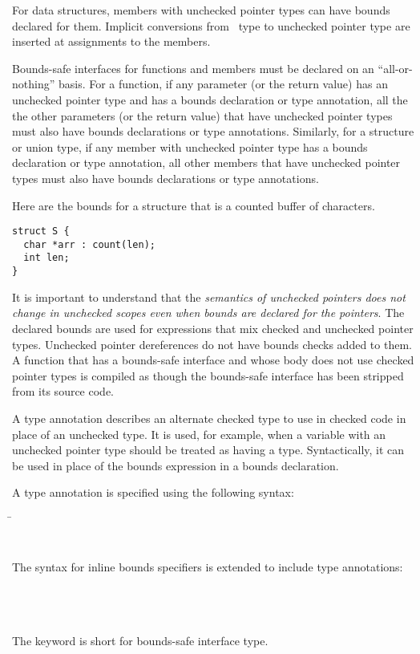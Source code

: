 For data structures, members with unchecked pointer types can
have bounds declared for them.   Implicit conversions from \arrayptr\ 
type to unchecked pointer type are inserted at assignments to the members.

Bounds-safe interfaces for functions and members must be
declared on an ``all-or-nothing'' basis.
For a function, if any parameter (or the return value) has an unchecked pointer
type and has a bounds declaration or type annotation, all the
the other parameters (or the return value) that have unchecked
pointer types must also have bounds declarations or type
annotations.  Similarly, for a structure or union type,
if any member with unchecked pointer type
has a bounds declaration or type annotation, all other members
that have unchecked pointer types must also have bounds declarations
or type annotations.

Here are the bounds for a structure that is a counted buffer of
characters.
\begin{lstlisting}
struct S {
  char *arr : count(len);
  int len;
}
\end{lstlisting}

It is important to understand that the \emph{semantics of unchecked
pointers does not change in unchecked scopes even when bounds are
declared for the pointers}. The declared bounds are used  for expressions
that mix checked and unchecked pointer types. Unchecked pointer dereferences do not
have bounds checks added to them. A function that has a bounds-safe
interface and whose body does not use checked pointer
types is compiled as though the bounds-safe interface has been
stripped from its source code.

A type annotation describes an alternate checked type to use in checked code
in place of an unchecked type. It is used, for example, when a variable with
an unchecked pointer type should be treated as having
a  type.  Syntactically, it can
be used in place of the  bounds expression in a bounds declaration.

A type annotation is specified using the following syntax:

\begin{tabbing}
\= \\
\>\code{)}\\
\\
The syntax for inline bounds specifiers is extended to include
type annotations:\\
\\
\\
\> \var{\ldots{}}\\
\>\code{:} 
\end{tabbing}
The keyword  is short for bounds-safe  interface type.


